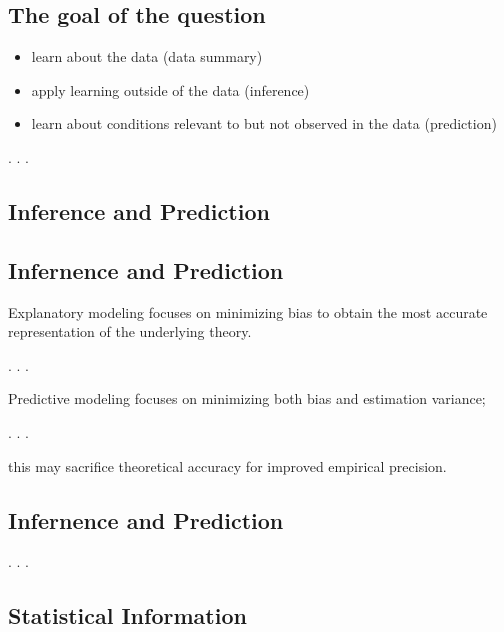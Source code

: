 \documentclass[
  letterpaper,
  DIV=11,
  numbers=noendperiod]{scrartcl}
\providecommand{\tightlist}{%
  \setlength{\itemsep}{0pt}\setlength{\parskip}{0pt}}\usepackage{longtable,booktabs,array}
\begin{document}
\hypertarget{the-goal-of-the-question}{%
\subsection{The goal of the question}\label{the-goal-of-the-question}}

\begin{itemize}
\tightlist
\item
  learn about the data ({data summary})
\item
  apply learning outside of the data ({inference})
\item
  learn about conditions relevant to but not observed in the data
  ({prediction})
\end{itemize}

. . .

\hypertarget{inference-and-prediction}{%
\subsection{Inference and Prediction}\label{inference-and-prediction}}

\hypertarget{infernence-and-prediction}{%
\subsection{Infernence and Prediction}\label{infernence-and-prediction}}

Explanatory modeling focuses on minimizing bias to obtain the most
accurate representation of the underlying theory.

. . .

Predictive modeling focuses on minimizing both bias and estimation
variance;

. . .

this may sacrifice theoretical accuracy for improved empirical
precision.

\hypertarget{infernence-and-prediction-1}{%
\subsection{Infernence and
Prediction}\label{infernence-and-prediction-1}}

. . .

\hypertarget{statistical-information}{%
\subsection{Statistical Information}\label{statistical-information}}
\end{document}
